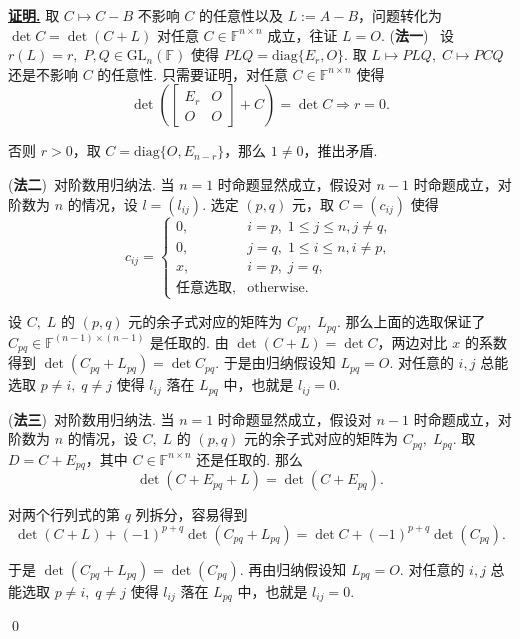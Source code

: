 \documentclass[10pt,openany]{article}
\theoremstyle{thmstyle} %
\theoremstyle{defstyle} %
\theoremstyle{prostyle} %
\theoremstyle{exastyle}
\theoremstyle{remstyle}
\renewenvironment{proof}[1][证明]{\par\underline{\textbf{#1.}} \;\fangsong}{\qed\par}
\newcommand{\F}{\mathbb{F}}
\newcommand{\gfn}{\text{GL}_n(\mathbb{F})}
\newcommand{\n}{^{n \times n}}
\newcommand{\diag}{\mathrm{diag}}
\begin{document}
\begin{proof}
	取 \( C \mapsto C-B \) 不影响 \( C \) 的任意性以及 \( L:=A-B \)，问题转化为 \( \det C=\det (C+L) \) 对任意  \( C \in \F\n \) 成立，往证 \( L=O \). 
	(\textbf{法一}) \ 设 \( r(L)=r, \; P,Q \in \gfn \) 使得 \( PLQ=\diag\{E_r,O\} \). 取 \( L \mapsto PLQ, \; C \mapsto PCQ \) 还是不影响 \( C \) 的任意性. 只需要证明，对任意 \( C \in \F\n \) 使得
	\[ \det \left( \begin{bmatrix}
		E_r & O \\ O & O
	\end{bmatrix}+C\right)=\det C \Rightarrow r=0. \]
	
	否则 \( r>0 \)，取 \( C=\diag\{O,E_{n-r}\} \)，那么 \( 1 \neq 0 \)，推出矛盾.
	
	\vspace{1ex}
	
	(\textbf{法二})\ 对阶数用归纳法. 当 \( n=1 \) 时命题显然成立，假设对 \( n-1 \) 时命题成立，对阶数为 \( n \) 的情况，设 \( l=(l_{ij}) \). 选定 \( (p,q) \) 元，取 \( C=(c_{ij}) \) 使得
	\[ c_{ij}=\left\{ \begin{array}{lr}
		0, & i=p, \; 1 \leq j \leq n, j \neq q, \\
		0, & j=q, \; 1 \leq i \leq n, i \neq p, \\
		x, & i=p, \; j=q, \\
		\text{任意选取}, & \text{otherwise}.
	\end{array}\right. \]
	
	设 \( C, \; L \) 的 \( (p,q) \) 元的余子式对应的矩阵为 \( C_{pq}, \; L_{pq} \). 那么上面的选取保证了 \( C_{pq} \in \F^{(n-1) \times (n-1)} \) 是任取的. 由 \( \det(C+L)=\det C \)，两边对比 \( x \) 的系数得到 \( \det(C_{pq}+L_{pq})=\det C_{pq} \). 于是由归纳假设知 \( L_{pq}=O \). 对任意的 \( i,j \) 总能选取 \( p \neq i, \; q \neq j \) 使得 \( l_{ij} \) 落在 \( L_{pq} \) 中，也就是 \( l_{ij}=0 \).
	
	\vspace{1ex}
	
	(\textbf{法三})\ 对阶数用归纳法. 当 \( n=1 \) 时命题显然成立，假设对 \( n-1 \) 时命题成立，对阶数为 \( n \) 的情况，设 \( C, \; L \) 的 \( (p,q) \) 元的余子式对应的矩阵为 \( C_{pq}, \; L_{pq} \). 取 \( D=C+E_{pq} \)，其中 \( C \in \F\n \) 还是任取的. 那么
	\[ \det(C+E_{pq}+L)=\det (C+E_{pq}). \]
	
	对两个行列式的第 \( q \) 列拆分，容易得到
	\[ \det(C+L)+(-1)^{p+q}\det(C_{pq}+L_{pq})=\det C+(-1)^{p+q} \det(C_{pq}). \]
	
	于是 \( \det(C_{pq}+L_{pq})=\det(C_{pq}) \). 再由归纳假设知 \( L_{pq}=O \). 对任意的 \( i,j \) 总能选取 \( p \neq i, \; q \neq j \) 使得 \( l_{ij} \) 落在 \( L_{pq} \) 中，也就是 \( l_{ij}=0 \).
	

\end{proof}
\end{document}
